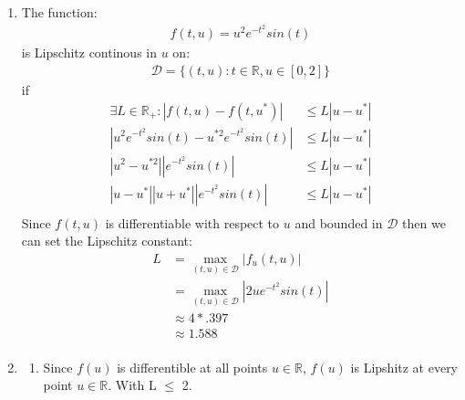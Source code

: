 \documentclass{article}
\begin{document}

\begin{enumerate}

\item 
The function:
\begin{equation*}
\begin{split}
f(t,u) = u^{2}e^{-t^{2}}sin(t)
\end{split}
\end{equation*}
is Lipschitz continous in $u$ on:
\begin{equation*}
\begin{split}
 \mathcal{D} =\{(t,u): t\in \mathbb{R}, u \in [0,2]\}
\end{split}
\end{equation*}
if 
\begin{equation*}
\begin{split}
\exists L \in \mathbb{R_{+}} : \left|f(t,u) -f(t,u^{*}) \right| & \leq L \left| u - u^{*} \right| \\
\left|  u^{2}e^{-t^{2}}sin(t) - u^{*2}e^{-t^{2}}sin(t)  \right|  &\leq L \left| u - u^{*} \right| \\
\left|  u^{2}- u^{*2}  \right| \left|e^{-t^{2}}sin(t)\right|  &\leq L \left| u - u^{*} \right| \\
\left|  u- u^{*}  \right| \left|u+u^{*}\right| \left|e^{-t^{2}}sin(t)\right|  &\leq L \left| u - u^{*} \right| \\
\end{split}
\end{equation*}
Since $f(t,u)$ is differentiable with respect to $u$ and bounded in $\mathcal{D}$ then we can set the Lipschitz constant:
\begin{equation*}
\begin{split}
L &= \max_{(t,u) \in \mathcal{D}} \left| f_{u}(t,u) \right| \\
& =  \max_{(t,u) \in \mathcal{D}} \left| 2ue^{-t^{2}}sin(t) \right| \\
&\approx 4*.397 \\
& \approx 1.588 \\
\end{split}
\end{equation*}
\item
\begin{enumerate}
\item
Since $f(u)$ is differentible at all points $u \in \mathbb{R}$, $f(u)$ is Lipshitz at every point $u \in \mathbb{R}$.
With L $\leq$ 2.

\end{enumerate}
\end{enumerate}
\end{document}
